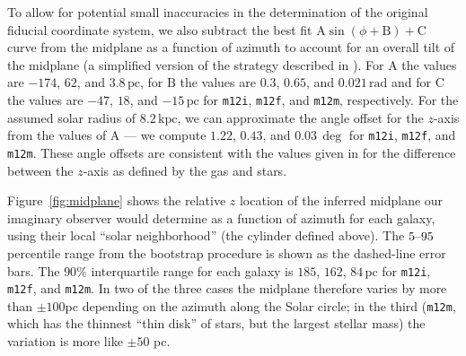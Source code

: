 \documentclass[twocolumn]{aastex62}
\newcommand{\pc}{\text{pc}}
\newcommand{\kpc}{\text{kpc}}
\newcommand{\mi}{\texttt{m12i}}
\newcommand{\mf}{\texttt{m12f}}
\newcommand{\mm}{\texttt{m12m}}
\newcommand{\uth}{\textsuperscript{th}}
\begin{document}
To allow for potential small inaccuracies in the determination of the original
fiducial coordinate system, we also subtract the best fit $\text{A}
\sin{\left(\phi + \text{B}\right)} + \text{C}$ curve from the midplane as a
function of azimuth to account for an overall tilt of the midplane (a
simplified version of the strategy described in
\citealt{2019ApJ...871..145A}). For $\text{A}$ the values are $-174$, $62$,
and $3.8\,\pc$, for $\text{B}$ the values are $0.3$, $0.65$, and
$0.021\,\text{rad}$ and for $\text{C}$ the values are $-47$, $18$, and
$-15\,\pc$ for \mi , \mf , and \mm , respectively. For the assumed solar
radius of $8.2\,\kpc$, we can approximate the angle offset for the $z$-axis
from the values of $\text{A}$ --- we compute $1.22$, $0.43$, and $0.03\,\deg$
for \mi , \mf , and \mm . These angle offsets are consistent with the values
given in \citet{2018arXiv180610564S} for the difference between the $z$-axis
as defined by the gas and stars.

Figure~\ref{fig:midplane} shows the relative $z$ location of the inferred
midplane our imaginary observer would determine as a function of azimuth for
each galaxy, using their local ``solar neighborhood'' (the cylinder defined
above). The $5\textup{--}95$ percentile range from the bootstrap procedure is
shown as the dashed-line error bars. The $90\%$ interquartile range for each
galaxy is $185$, $162$, $84\,\pc$ for \mi , \mf , and \mm . In two of the
three cases the midplane therefore varies by more than $\pm 100$pc depending
on the azimuth along the Solar circle; in the third (\mm , which has the
thinnest ``thin disk'' of stars, but the largest stellar mass) the variation
is more like $\pm 50$ pc.

\begin{figure*}
\caption{The local midplane determined at the fiducial Solar radius
($8.2\,\kpc$) for the three FIRE galaxies \mi , \mf , and \mm\ ({\em left},
{\em center}, and {\em right} panels). The local midplane is determined at a
position $\phi$ by taking the median height of all stars within $R=0.5\,\kpc$
and $z=1\,\kpc$ (in cylindrical coordinates). The procedure is performed again
using the new height $10$ times to converge on the local midplane height. In
order to allow for the possibility that the fiducial Galactocentric coordinate
system is incorrect, we subtract the best fit $A\sin{(\phi+B)}+C$ curve from
each panel --- this figure is reproduced with the original midplane
determination (i.e. before subtracting the best fit sine curve) in
Appendix~\ref{app:lsr}. We then bootstrap resample $1000$ times on all stars within
a $2\,\kpc$ height of the fiducial midplane to determine error bars (95\uth
and 5\uth percentiles), which we report as dashed lines.}
\label{fig:midplane}
\end{figure*}
\end{document}
